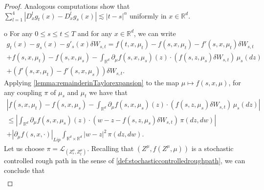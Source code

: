 \documentclass[10pt, a4paper]{article} %
\newcommand{\R}{\mathbb{R}}
\theoremstyle{definition}
\theoremstyle{plain}
\begin{document}
\begin{proof}
    Analogous computations show that $\sum_{l=1}^4 |D^l_x g_t(x) - D^l_x g_s(x)|  \lesssim |t-s|^\alpha$ uniformly in $x \in \R^d$. \\
    o
    For any $0 \le s \le t \le T$ and for any $x \in \R^d$, we can write \begin{multline} \label{eq:decompositionoftheremainder_uniqueness}
        g_t(x) - g_s(x) - g'_s(x) \delta W_{s,t} = f(t, x,\mu_t) - f(s, x,\mu_t) - f'(s, x,\mu_t) \delta W_{s,t}  \\
        + f(s, x,\mu_t) - f(s, x,\mu_s)  - \int_{\R^d} \partial_\mu f(s, x,\mu_s) (z) \cdot (f(s, z,\mu_s) \delta W_{s,t}) \, \mu_s(dz)  \\ + (f'(s, x,\mu_t)   - f'(s, x,\mu_s)) \delta W_{s,t} . 
    \end{multline}
    {Applying \cref{lemma:remainderinTaylorexpansion} to the map $\mu \mapsto f(s,x,\mu)$, for any coupling $\pi$ of $\mu_s$ and $\mu_t$ we have that \begin{multline*}
        \left| f(s, x,\mu_t) - f(s, x,\mu_s)  - \int_{\R^d} \partial_\mu f(s, x,\mu_s) (z) \cdot (f(s, z,\mu_s) \delta W_{s,t}) \, \mu_s(dz) \right| \\ \le \left| \int_{\R^d} \partial_\mu f(s, x,\mu_s) (z) \cdot (w-z-f(s, z,\mu_s) \delta W_{s,t}) \, \pi (dz,dw) \right|  \\ 
        + |\partial_\mu f(s, x,\cdot)|_{Lip} \int_{\R^d \times \R^d} |w-z|^2 \, \pi(dz,dw) .
    \end{multline*}
    Let us choose $\pi=\mathcal{L}_{(Z^\mu_s,Z^\mu_t)}$. Recalling that $(Z^\mu, f(Z^\mu,\mu))$ is a stochastic controlled rough path in the sense of \cref{def:stochasticcontrolledroughpath}, we can conclude that \begin{align*}

\end{align*}}
\end{proof}
\end{document}
